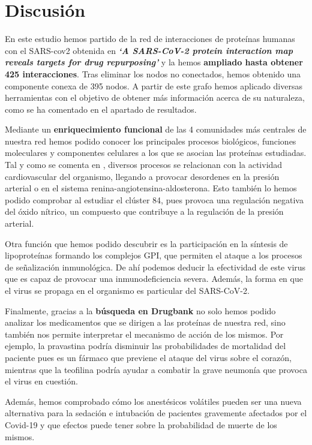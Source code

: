 \section{Discusión}

En este estudio hemos partido de la red de interacciones de proteínas humanas con el SARS-cov2 obtenida en \textbf{\textit{‘A SARS-CoV-2 protein interaction map reveals targets for drug repurposing’}} y la hemos \textbf{ampliado hasta obtener 425 interacciones}. Tras eliminar los nodos no conectados, hemos obtenido una componente conexa de 395 nodos. A partir de este grafo hemos aplicado diversas herramientas con el objetivo de obtener más información acerca de su naturaleza, como se ha comentado en el apartado de resultados.


Mediante un \textbf{enriquecimiento funcional} de las 4 comunidades más centrales de nuestra red hemos podido conocer los principales procesos biológicos, funciones moleculares y componentes celulares a los que se asocian las proteínas estudiadas. Tal y como se comenta en  \cite{Gysi2020NetworkCOVID-19}, diversos procesos se relacionan con la actividad cardiovascular del organismo, llegando a provocar desordenes en la presión arterial o en el sistema renina-angiotensina-aldosterona. Esto también lo hemos podido comprobar al estudiar el clúster 84, pues provoca una regulación negativa del óxido nítrico, un compuesto que contribuye a la regulación de la presión arterial.


Otra función que hemos podido descubrir es la participación en la síntesis de lipoproteínas formando los complejos GPI, que permiten el ataque a los procesos de señalización inmunológica. De ahí podemos deducir la efectividad de este virus que es capaz de provocar una inmunodeficiencia severa. Además, la forma en que el virus se propaga en el organismo es particular del SARS-CoV-2.


Finalmente, gracias a la \textbf{búsqueda en Drugbank} no solo hemos podido analizar los medicamentos que se dirigen a las proteínas de nuestra red, sino también nos permite interpretar el mecanismo de acción de los mismos. Por ejemplo, la pravastina podría disminuir las probabilidades de mortalidad del paciente pues es un fármaco que previene el ataque del virus sobre el corazón, mientras que la teofilina podría ayudar a combatir la grave neumonía que provoca el virus en cuestión. 


Además, hemos comprobado cómo los anestésicos volátiles pueden ser una nueva alternativa para la sedación e intubación de pacientes gravemente afectados por el Covid-19 y que efectos puede tener sobre la probabilidad de muerte de los mismos.

